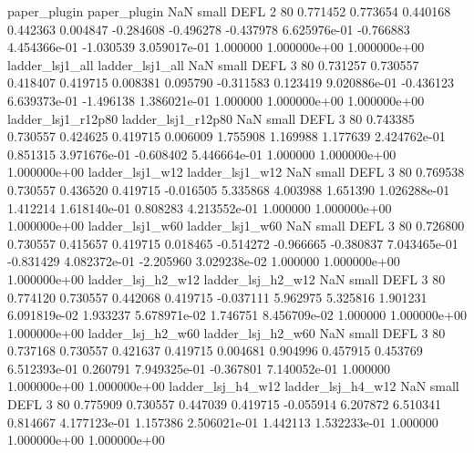             paper_plugin             paper_plugin                   NaN      small     DEFL                 2 80 0.771452       0.773654 0.440168       0.442363    0.004847     -0.284608     -0.496278    -0.437978   6.625976e-01 -0.766883 4.454366e-01    -1.030539   3.059017e-01            1.000000    1.000000e+00        1.000000e+00
         ladder_lsj1_all          ladder_lsj1_all                   NaN      small     DEFL                 3 80 0.731257       0.730557 0.418407       0.419715    0.008381      0.095790     -0.311583     0.123419   9.020886e-01 -0.436123 6.639373e-01    -1.496138   1.386021e-01            1.000000    1.000000e+00        1.000000e+00
      ladder_lsj1_r12p80       ladder_lsj1_r12p80                   NaN      small     DEFL                 3 80 0.743385       0.730557 0.424625       0.419715    0.006009      1.755908      1.169988     1.177639   2.424762e-01  0.851315 3.971676e-01    -0.608402   5.446664e-01            1.000000    1.000000e+00        1.000000e+00
         ladder_lsj1_w12          ladder_lsj1_w12                   NaN      small     DEFL                 3 80 0.769538       0.730557 0.436520       0.419715   -0.016505      5.335868      4.003988     1.651390   1.026288e-01  1.412214 1.618140e-01     0.808283   4.213552e-01            1.000000    1.000000e+00        1.000000e+00
         ladder_lsj1_w60          ladder_lsj1_w60                   NaN      small     DEFL                 3 80 0.726800       0.730557 0.415657       0.419715    0.018465     -0.514272     -0.966665    -0.380837   7.043465e-01 -0.831429 4.082372e-01    -2.205960   3.029238e-02            1.000000    1.000000e+00        1.000000e+00
       ladder_lsj_h2_w12        ladder_lsj_h2_w12                   NaN      small     DEFL                 3 80 0.774120       0.730557 0.442068       0.419715   -0.037111      5.962975      5.325816     1.901231   6.091819e-02  1.933237 5.678971e-02     1.746751   8.456709e-02            1.000000    1.000000e+00        1.000000e+00
       ladder_lsj_h2_w60        ladder_lsj_h2_w60                   NaN      small     DEFL                 3 80 0.737168       0.730557 0.421637       0.419715    0.004681      0.904996      0.457915     0.453769   6.512393e-01  0.260791 7.949325e-01    -0.367801   7.140052e-01            1.000000    1.000000e+00        1.000000e+00
       ladder_lsj_h4_w12        ladder_lsj_h4_w12                   NaN      small     DEFL                 3 80 0.775909       0.730557 0.447039       0.419715   -0.055914      6.207872      6.510341     0.814667   4.177123e-01  1.157386 2.506021e-01     1.442113   1.532233e-01            1.000000    1.000000e+00        1.000000e+00
